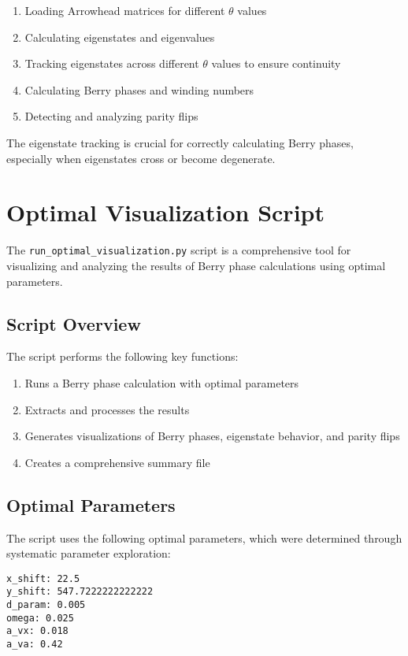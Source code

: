 \documentclass{article}
\begin{document}
\begin{enumerate}
    \item Loading Arrowhead matrices for different $\theta$ values
    \item Calculating eigenstates and eigenvalues
    \item Tracking eigenstates across different $\theta$ values to ensure continuity
    \item Calculating Berry phases and winding numbers
    \item Detecting and analyzing parity flips
\end{enumerate}

The eigenstate tracking is crucial for correctly calculating Berry phases, especially when eigenstates cross or become degenerate.

\section{Optimal Visualization Script}

The \texttt{run\_optimal\_visualization.py} script is a comprehensive tool for visualizing and analyzing the results of Berry phase calculations using optimal parameters.

\subsection{Script Overview}

The script performs the following key functions:

\begin{enumerate}
    \item Runs a Berry phase calculation with optimal parameters
    \item Extracts and processes the results
    \item Generates visualizations of Berry phases, eigenstate behavior, and parity flips
    \item Creates a comprehensive summary file
\end{enumerate}

\subsection{Optimal Parameters}

The script uses the following optimal parameters, which were determined through systematic parameter exploration:

\begin{verbatim}
x_shift: 22.5
y_shift: 547.7222222222222
d_param: 0.005
omega: 0.025
a_vx: 0.018
a_va: 0.42
\end{verbatim}
\end{document}
